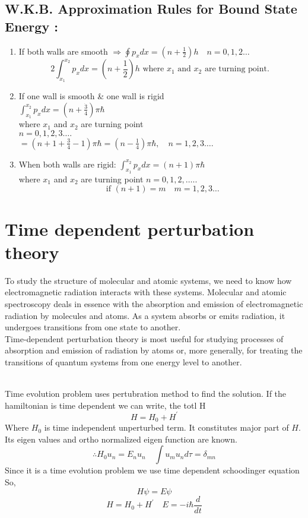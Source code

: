 \subsection{ W.K.B. Approximation Rules for Bound State Energy :}
\begin{enumerate}
	\item  If both walls are smooth $\Rightarrow \oint p_{x} d x=\left(n+\frac{1}{2}\right) h \quad n=0,1,2 \ldots$
	$$
	2 \int_{x_{1}}^{x_{2}} p_{x} d x=\left(n+\frac{1}{2}\right) h \text { where } x_{1} \text { and } x_{2} \text { are turning point. }
	$$
	\item If one wall is smooth \& one wall is rigid \\
	$\int_{x_{1}}^{x_{2}} p_{x} d x=\left(n+\frac{\dot{3}}{4}\right) \pi \hbar \quad$\\
	 where $x_{1}$ and $x_{2}$ are turning point\\
	  $n=0,1,2,3 \ldots .$ \\
	  $=\left(n+1+\frac{3}{4}-1\right) \pi \hbar=\left(n-\frac{1}{4}\right) \pi \hbar, \quad n=1,2,3 \ldots .$
	  \item When both walls are rigid:
	  $\int_{x_{1}}^{x_{2}} p_{x} d x=(n+1) \pi \hbar \quad$ \\
	  where $x_{1}$ and $x_{2}$ are turning point $n=0,1,2, \ldots . .$
	  $$
	  \text { if }(n+1)=m \quad m=1,2,3 \ldots
	  $$
\end{enumerate}


\section{Time dependent perturbation theory}
To study the structure of molecular and atomic systems, we need to know how electromagnetic radiation interacts with these systems. Molecular and atomic spectroscopy deals in essence with the absorption and emission of electromagnetic radiation by molecules and atoms. As a system absorbs or emits radiation, it undergoes transitions from one state to another.\\
Time-dependent perturbation theory is most useful for studying processes of absorption and emission of radiation by atoms or, more generally, for treating the transitions of quantum systems from one energy level to another.\\\\
\par Time evolution problem uses pertubration method to find the solution. If the hamiltonian is time dependent we can write, the totl H
$$H=H_0+H^\prime$$
Where $H_0$ is time independent unperturbed term. It constitutes major part of $H$.
Its eigen values and ortho normalized eigen function are known.
$$\therefore H_0u_n=E_n u_n\quad \int u_m u_n d\tau=\delta_{mn}$$
Since it is a time evolution problem we use time dependent schoodinger equation \\
So,
$$H\psi=E\psi$$
$$H=H_0+H^\prime\quad E=-i\hbar\frac{ d}{dt}$$

